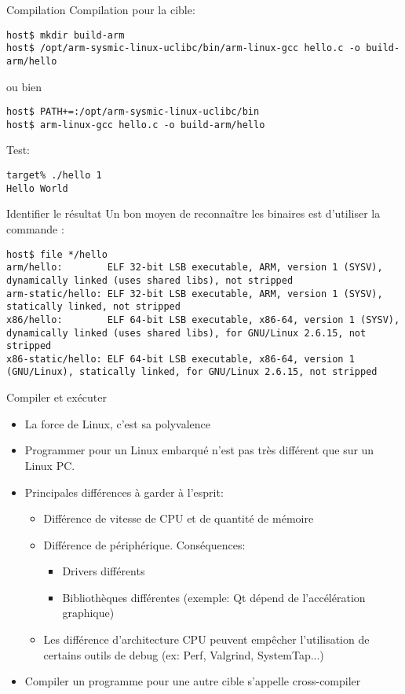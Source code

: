 \begin{frame}[fragile=singleslide]{Compilation}
  Compilation pour la cible:
  \begin{lstlisting}
host$ mkdir build-arm
host$ /opt/arm-sysmic-linux-uclibc/bin/arm-linux-gcc hello.c -o build-arm/hello
  \end{lstlisting} 
  ou bien
  \begin{lstlisting} 
host$ PATH+=:/opt/arm-sysmic-linux-uclibc/bin
host$ arm-linux-gcc hello.c -o build-arm/hello
  \end{lstlisting}
  Test:
  \begin{lstlisting} 
target% ./hello 1
Hello World
  \end{lstlisting} %
\end{frame}

\begin{frame}[fragile=singleslide]{Identifier le résultat}
  Un bon moyen de reconnaître  les binaires est d'utiliser la commande
  :
\begin{lstlisting}
host$ file */hello
arm/hello:        ELF 32-bit LSB executable, ARM, version 1 (SYSV), dynamically linked (uses shared libs), not stripped
arm-static/hello: ELF 32-bit LSB executable, ARM, version 1 (SYSV), statically linked, not stripped
x86/hello:        ELF 64-bit LSB executable, x86-64, version 1 (SYSV), dynamically linked (uses shared libs), for GNU/Linux 2.6.15, not stripped
x86-static/hello: ELF 64-bit LSB executable, x86-64, version 1 (GNU/Linux), statically linked, for GNU/Linux 2.6.15, not stripped
\end{lstlisting} %
\end{frame}

\begin{frame}{Compiler et exécuter}
  \begin{itemize}
  \item La force de Linux, c'est sa polyvalence
  \item Programmer  pour un Linux  embarqué n'est pas  très différent
    que sur un Linux PC.
  \item Principales différences à garder à l'esprit:
    \begin{itemize}
    \item Différence de vitesse de CPU et de quantité de mémoire
    \item Différence de périphérique. Conséquences:
      \begin{itemize}
      \item Drivers différents
      \item   Bibliothèques   différentes   (exemple:  Qt   dépend   de
        l'accélération graphique)
      \end{itemize}
    \item   Les  différence   d'architecture   CPU  peuvent   empêcher
      l'utilisation de  certains outils de debug  (ex: Perf, Valgrind,
      SystemTap...)
    \end{itemize}
  \item  Compiler   un  programme  pour  une   autre  cible  s'appelle
    cross-compiler
  \end{itemize}
\end{frame}

